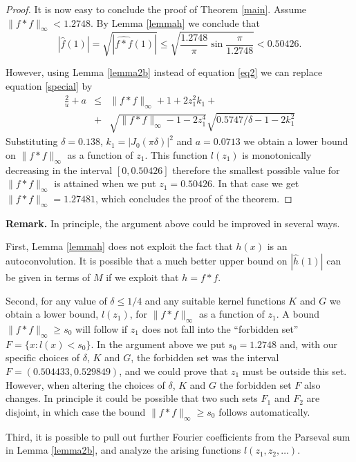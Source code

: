 \documentclass[12pt]{amsart}
\theoremstyle{definition}
\begin{document}
\begin{proof}
\normalsize
It is now easy to conclude the proof of Theorem \ref{main}. Assume
$\|f\ast f\|_\infty<1.2748$. By Lemma \ref{lemmah} we conclude that
$$|\hat f(1)|=\sqrt{|\widehat{f\ast f}(1)|}\le \sqrt{\frac{1.2748}{\pi} \sin
\frac{\pi}{1.2748}} < 0.50426.$$

However, using Lemma \ref{lemma2b} instead of equation \eqref{eq2}
we can replace equation \eqref{special} by
\begin{eqnarray}\label{modified}
\frac{2}{u}+a &\le& \|f\ast f\|_\infty+1+2z_1^2k_1 +\\
&+&\sqrt{\|f\ast f\|_\infty-1-2z_1^4}\sqrt{0.5747/\delta-1-2k_1^2} \nonumber
\end{eqnarray}
Substituting $\delta=0.138$, $k_1=|J_0(\pi \delta)|^2$ and
$a=0.0713$ we obtain a lower bound on $\|f\ast f\|_\infty$ as a function of $z_1$.
This function $l(z_1)$ is monotonically decreasing in the interval
$[0, 0.50426]$ therefore the smallest possible value for $\|f\ast f\|_\infty$ is
attained when we put $z_1=0.50426$. In that case we get
$\|f\ast f\|_\infty=1.27481$, which concludes the proof of the theorem.
\end{proof}

\bigskip

{\bf Remark.} In principle, the argument above could be improved
in several ways.

First, Lemma \ref{lemmah} does not exploit the fact that $h(x)$ is
an autoconvolution. It is possible that a much better upper bound
on $|\hat h(1)|$ can be given in terms of $M$ if we exploit that
$h=f\ast f$.

Second, for any value of $\delta \le 1/4$ and any suitable kernel
functions $K$ and $G$ we obtain a lower bound, $l(z_1)$, for $\|f\ast f\|_\infty$ as a
function of $z_1$. A bound $\|f\ast f\|_\infty \ge s_0$ will follow if $z_1$ does
not fall into the ``forbidden set'' $F=\{x: l(x) < s_0\}$. In the
argument above we put $s_0=1.2748$ and, with our specific choices
of $\delta$, $K$ and $G$, the forbidden set was the interval
$F = (0.504433,0.529849)$, and we could prove that $z_1$ must be
outside this set. However, when altering the choices of $\delta$,
$K$ and $G$ the forbidden set $F$ also changes. In principle it
could be possible that two such sets $F_1$ and $F_2$ are disjoint,
in which case the bound $\|f\ast f\|_\infty \ge s_0$ follows automatically.

Third, it is possible to pull out further Fourier coefficients
from the Parseval sum in Lemma \ref{lemma2b}, and analyze the
arising functions $l(z_1, z_2, \dots )$.
\end{document}
